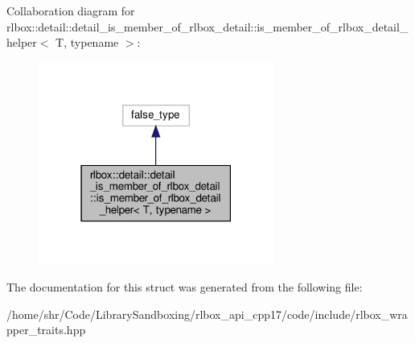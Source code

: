 Collaboration diagram for rlbox\+:\+:detail\+:\+:detail\+\_\+is\+\_\+member\+\_\+of\+\_\+rlbox\+\_\+detail\+:\+:is\+\_\+member\+\_\+of\+\_\+rlbox\+\_\+detail\+\_\+helper$<$ T, typename $>$\+:\nopagebreak
\begin{figure}[H]
\begin{center}
\leavevmode
\includegraphics[width=219pt]{structrlbox_1_1detail_1_1detail__is__member__of__rlbox__detail_1_1is__member__of__rlbox__detail__helper__coll__graph}
\end{center}
\end{figure}


The documentation for this struct was generated from the following file\+:\begin{DoxyCompactItemize}
\item 
/home/shr/\+Code/\+Library\+Sandboxing/rlbox\+\_\+api\+\_\+cpp17/code/include/rlbox\+\_\+wrapper\+\_\+traits.\+hpp\end{DoxyCompactItemize}
